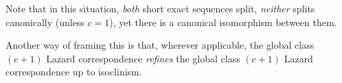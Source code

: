 Note that in this situation, {\em both} short exact sequences split,
{\em neither} splits canonically (unless $c = 1$), yet there is a
canonical isomorphism between them.

Another way of framing this is that, wherever applicable, the global
class $(c + 1)$ Lazard correspondence {\em refines} the global class
$(c + 1)$ Lazard correspondence up to isoclinism.







